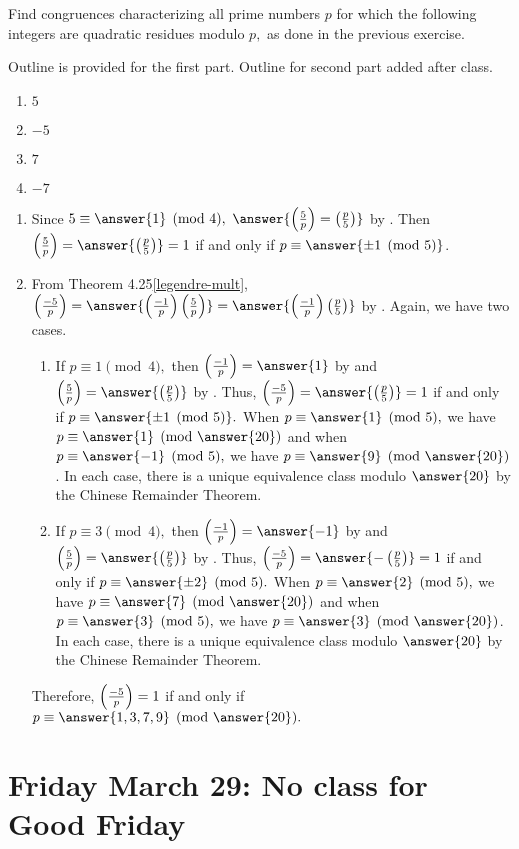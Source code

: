\documentclass[letterpaper, 11 pt]{ximera}
\begin{document}
\begin{br}
	Find congruences characterizing all prime numbers $p$ for which the following integers are quadratic residues modulo $p,$ as done in the previous exercise. 
	
	Outline is provided for the first part. Outline for second part added after class.
	\begin{enumerate}[label=(\alph*)]
		\item $5$ 
		\item $-5$	
		\item $7$ 
		\item $-7$	
	\end{enumerate}
\end{br}

\begin{solution}
 	\begin{enumerate}[label=(\alph*)]
		\item Since $5\equiv\answer{1}\pmod{4},$ $\answer{\legendre{5}{p}=\legendre{p}{5}}$ by . Then $\legendre{5}{p}=\answer{\legendre{p}{5}}=1$ if and only if $p\equiv\answer{ \pm1\pmod{5}}$.

		\item From Theorem 4.25\ref{legendre-mult}, $\legendre{-5}{p}= \answer{\legendre{-1}{p}\legendre{5}{p}}=\answer{\legendre{-1}{p}\legendre{p}{5}}$ by . Again, we have two cases.
			
			\begin{enumerate}[label=(\roman*)]
 				\item If $p\equiv 1\pmod{4},$ then $\legendre{-1}{p}=\answer{1}$ by  and
				$\legendre{5}{p}=\answer{\legendre{p}{5}}$ by . Thus, $\legendre{-5}{p}=\answer{\legendre{p}{5}}=1$ if and only if $p\equiv \answer{\pm1\pmod{5}}.$ When $p\equiv \answer{1}\pmod{5},$ we have $p\equiv\answer{1}\pmod{\answer{20}}$ and when $p\equiv \answer{-1}\pmod{5},$ we have $p\equiv\answer{9}\pmod{\answer{20}}$. In each case, there is a unique equivalence class modulo $\answer{20}$ by the Chinese Remainder Theorem.
		
		\item If $p\equiv 3\pmod{4},$ then $\legendre{-1}{p}=\answer{-1}$ by  and
				$\legendre{5}{p}=\answer{\legendre{p}{5}}$ by . Thus, $\legendre{-5}{p}=\answer{-\legendre{p}{5}}=1$ if and only if $p\equiv \answer{\pm 2}\pmod{5}.$ When $p\equiv \answer{2}\pmod{5},$ we have $p\equiv\answer{7}\pmod{\answer{20}}$ and when $p\equiv \answer{3}\pmod{5},$ we have $p\equiv\answer{3}\pmod{\answer{20}}$. In each case, there is a unique equivalence class modulo $\answer{20}$ by the Chinese Remainder Theorem.
	\end{enumerate}
	Therefore, $\left(\frac{-5}{p}\right)=1$ if and only if $p\equiv \answer{1,3,7,9}\pmod{\answer{20}}.$\qedhere
	\end{enumerate}
\end{solution}

\section{Friday March 29: No class for Good Friday}
\end{document}
